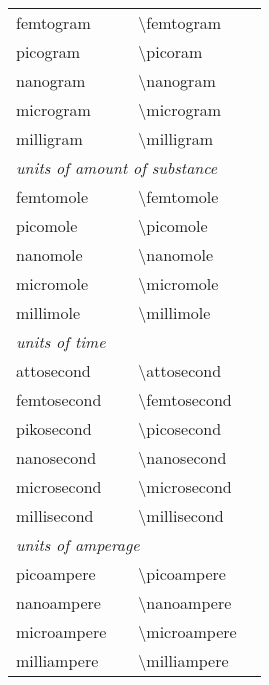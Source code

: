 \begin{longtable}{Xl>{\ttfamily\textbackslash}Xl}
     femtogram        &\unitsignonly{\femtogram}        &femtogram&\cmd{\fg}\\
     picogram         &\unitsignonly{\picogram}         &picoram&\cmd{\pg}\\
     nanogram         &\unitsignonly{\nanogram}         &nanogram&\cmd{\nanog}\\
     microgram        &\unitsignonly{\microgram}        &microgram&\cmd{\micg}\\
     milligram        &\unitsignonly{\milligram}        &milligram&\cmd{\mg}\\[1ex]
     \multicolumn{4}{l}{\emph{units of amount of substance}}\\[.5ex]
     femtomole        &\unitsignonly{\femtomole}        &femtomole&\cmd{\fmol}\\
     picomole         &\unitsignonly{\picomole}         &picomole&\cmd{\pmol}\\
     nanomole         &\unitsignonly{\nanomole}         &nanomole&\cmd{\nmol}\\
     micromole        &\unitsignonly{\micromole}        &micromole&\cmd{\micmol}\\
     millimole        &\unitsignonly{\millimole}        &millimole&\cmd{\mmol}\\[1ex]
     \multicolumn{4}{l}{\emph{units of time}}\\[.5ex]
     attosecond       &\unitsignonly{\attosecond}       &attosecond&\\
     femtosecond      &\unitsignonly{\femtosecond}      &femtosecond&\cmd{\fs}\\
     pikosecond       &\unitsignonly{\picosecond}       &picosecond&\cmd{\ps}\\
     nanosecond       &\unitsignonly{\nanosecond}       &nanosecond&\cmd{\ns}\\
     microsecond      &\unitsignonly{\microsecond}      &microsecond&\cmd{\mics}\\
     millisecond      &\unitsignonly{\millisecond}      &millisecond&\cmd{\ms}\\[1ex]
     \multicolumn{4}{l}{\emph{units of amperage}}\\[.5ex]
     picoampere       &\unitsignonly{\picoampere}       &picoampere&\cmd{\pA}\\
     nanoampere       &\unitsignonly{\nanoampere}       &nanoampere&\cmd{\nA}\\
     microampere      &\unitsignonly{\microampere}      &microampere&\cmd{\micA}\\
     milliampere      &\unitsignonly{\milliampere}      &milliampere&\cmd{\mA}\\

\end{longtable}
